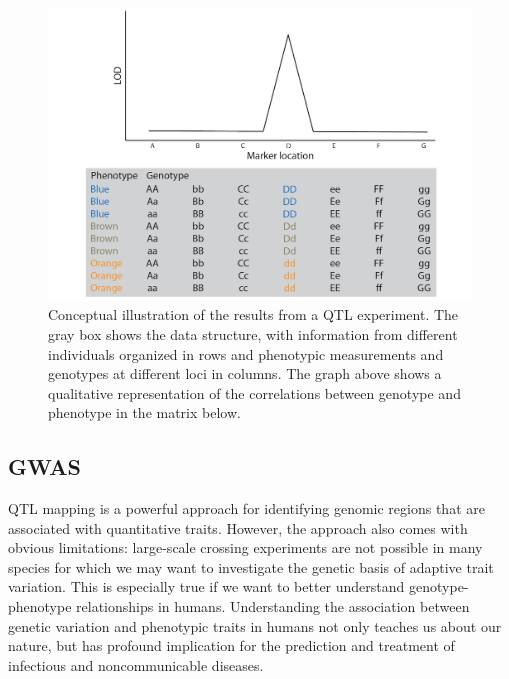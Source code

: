 \documentclass[
]{book}
\begin{document}
\begin{figure}
\includegraphics[width=1\linewidth]{images/qtl2} \caption{Conceptual illustration of the results from a QTL experiment. The gray box shows the data structure, with information from different individuals organized in rows and phenotypic measurements and genotypes at different loci in columns. The graph above shows a qualitative representation of the correlations between genotype and phenotype in the matrix below.}\label{fig:qtl2}
\end{figure}

\hypertarget{gwas}{%
\subsection{GWAS}\label{gwas}}

QTL mapping is a powerful approach for identifying genomic regions that are associated with quantitative traits. However, the approach also comes with obvious limitations: large-scale crossing experiments are not possible in many species for which we may want to investigate the genetic basis of adaptive trait variation. This is especially true if we want to better understand genotype-phenotype relationships in humans. Understanding the association between genetic variation and phenotypic traits in humans not only teaches us about our nature, but has profound implication for the prediction and treatment of infectious and noncommunicable diseases.
\end{document}
